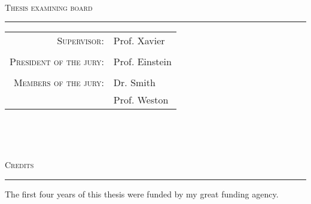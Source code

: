 
\thispagestyle{empty}
~\vfill


\begin{center}

\textsc{Thesis examining board}\\
\rule{0.5\linewidth}{0.5pt}
\vspace{0.5cm}

\begin{tabular}{rl}
\textsc{Supervisor:} & Prof. Xavier\\
& \\
\textsc{President of the jury:} & Prof. Einstein \\
& \\
\textsc{Members of the jury:} & Dr. Smith\\
& Prof. Weston\\
\end{tabular}

\end{center}




~\newpage
\thispagestyle{empty}
~\newpage
\thispagestyle{empty}

~\vfill

\begin{center}

\textsc{Credits}\\
\rule{0.5\linewidth}{0.5pt}
\vspace{0.5cm}

The first four years of this thesis were funded by my great funding agency.

\end{center}


